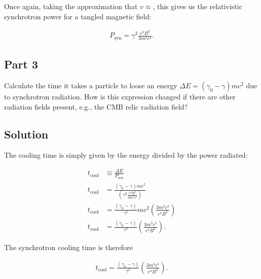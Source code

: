 \documentclass[12pt]{article}
\begin{document}
{\noindent}Once again, taking the approximation that $v \approx$, this gives us the relativistic synchrotron power for a tangled magnetic field:

\begin{align*}
    \boxed{P_\mathrm{syn} = \gamma^2 \frac{e^4B^2}{3m^2c^3}}.
\end{align*}


\subsection*{Part 3}

Calculate the time it takes a particle to loose an energy $\Delta E = (\gamma_0 - \gamma)mc^2$ due to synchrotron radiation. How is this expression changed if there are other radiation fields present, e.g., the CMB relic radiation field?


\subsection*{Solution}

The cooling time is simply given by the energy divided by the power radiated:

\begin{equation*}
\begin{split}
    t_\mathrm{cool} &\equiv \frac{\Delta E}{P_\mathrm{syn}} \\
    t_\mathrm{cool} &= \frac{(\gamma_0 - \gamma)mc^2}{\left(\gamma^2 \frac{e^4B^2}{3m^2c^3}\right)} \\
    t_\mathrm{cool} &= \frac{(\gamma_0 - \gamma)}{\gamma^2} mc^2 \left(\frac{3m^2c^3}{e^4B^2}\right) \\
    t_\mathrm{cool} &= \frac{(\gamma_0 - \gamma)}{\gamma^2} \left(\frac{3m^3c^5}{e^4B^2}\right).
\end{split}
\end{equation*}

{\noindent}The synchrotron cooling time is therefore

\begin{align*}
    \boxed{t_\mathrm{cool} = \frac{(\gamma_0 - \gamma)}{\gamma^2} \left(\frac{3m^3c^5}{e^4B^2}\right)}.
\end{align*}
\end{document}
